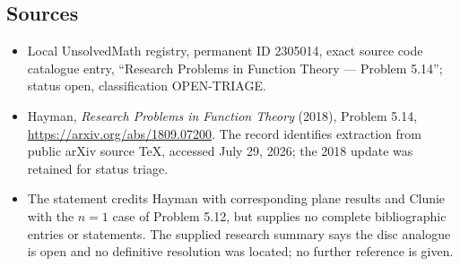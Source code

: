 \documentclass[11pt]{article}
\begin{document}
\subsection{Sources}
\begin{itemize}
\item Local UnsolvedMath registry, permanent ID 2305014, exact source code catalogue entry, ``Research Problems in Function Theory --- Problem 5.14''; status open, classification OPEN-TRIAGE.
\item Hayman, \emph{Research Problems in Function Theory} (2018), Problem 5.14, \url{https://arxiv.org/abs/1809.07200}. The record identifies extraction from public arXiv source TeX, accessed July 29, 2026; the 2018 update was retained for status triage.
\item The statement credits Hayman with corresponding plane results and Clunie with the $n=1$ case of Problem 5.12, but supplies no complete bibliographic entries or statements. The supplied research summary says the disc analogue is open and no definitive resolution was located; no further reference is given.
\end{itemize}
\end{document}

